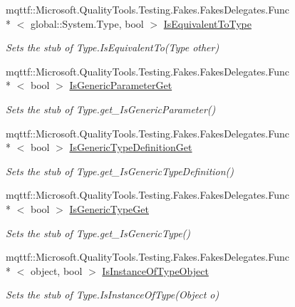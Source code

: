 \begin{DoxyCompactItemize}
mqttf\-::\-Microsoft.\-Quality\-Tools.\-Testing.\-Fakes.\-Fakes\-Delegates.\-Func\\*
$<$ global\-::\-System.\-Type, bool $>$ \hyperlink{class_system_1_1_reflection_1_1_fakes_1_1_stub_type_delegator_a10eb112f22a3f56dcbab11d381303cf1}{Is\-Equivalent\-To\-Type}
\begin{DoxyCompactList}\small\item\em Sets the stub of Type.\-Is\-Equivalent\-To(\-Type other)\end{DoxyCompactList}\item 
mqttf\-::\-Microsoft.\-Quality\-Tools.\-Testing.\-Fakes.\-Fakes\-Delegates.\-Func\\*
$<$ bool $>$ \hyperlink{class_system_1_1_reflection_1_1_fakes_1_1_stub_type_delegator_a8319b92980167fd8688744d11d6fff7f}{Is\-Generic\-Parameter\-Get}
\begin{DoxyCompactList}\small\item\em Sets the stub of Type.\-get\-\_\-\-Is\-Generic\-Parameter()\end{DoxyCompactList}\item 
mqttf\-::\-Microsoft.\-Quality\-Tools.\-Testing.\-Fakes.\-Fakes\-Delegates.\-Func\\*
$<$ bool $>$ \hyperlink{class_system_1_1_reflection_1_1_fakes_1_1_stub_type_delegator_a453f82cef5f387ec25c22138af75e807}{Is\-Generic\-Type\-Definition\-Get}
\begin{DoxyCompactList}\small\item\em Sets the stub of Type.\-get\-\_\-\-Is\-Generic\-Type\-Definition()\end{DoxyCompactList}\item 
mqttf\-::\-Microsoft.\-Quality\-Tools.\-Testing.\-Fakes.\-Fakes\-Delegates.\-Func\\*
$<$ bool $>$ \hyperlink{class_system_1_1_reflection_1_1_fakes_1_1_stub_type_delegator_a5080615829d13ebc4051fb3319caeec8}{Is\-Generic\-Type\-Get}
\begin{DoxyCompactList}\small\item\em Sets the stub of Type.\-get\-\_\-\-Is\-Generic\-Type()\end{DoxyCompactList}\item 
mqttf\-::\-Microsoft.\-Quality\-Tools.\-Testing.\-Fakes.\-Fakes\-Delegates.\-Func\\*
$<$ object, bool $>$ \hyperlink{class_system_1_1_reflection_1_1_fakes_1_1_stub_type_delegator_a983569b2ef8ea5cee567bce3436c7a64}{Is\-Instance\-Of\-Type\-Object}
\begin{DoxyCompactList}\small\item\em Sets the stub of Type.\-Is\-Instance\-Of\-Type(\-Object o)\end{DoxyCompactList}\item 

\end{DoxyCompactItemize}
